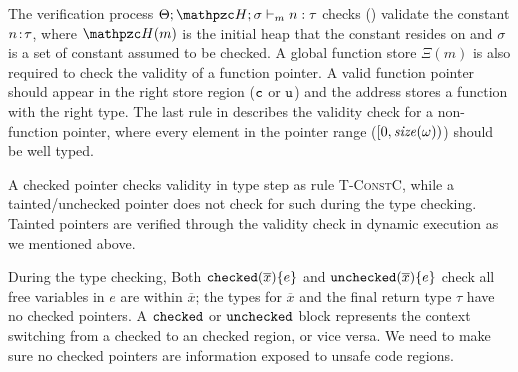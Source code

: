 The verification process $\Theta;\heap;\sigma \vdash_m n : \tau$ checks ()
validate the constant ${n}\!:\!{\tau}$, 
where $\heap(m)$ is the initial heap that the constant resides on and
$\sigma$ is a set of constant assumed to be checked.
A global function store $\Xi(m)$ is also required to check the validity of a function pointer.
A valid function pointer should appear in the right store region ($\texttt{c}$ or $\texttt{u}$)
and the address stores a function with the right type.
The last rule in  describes the validity check for a non-function pointer, 
where every element in the pointer range ($[0,\mathit{size}(\omega))$) should be well
typed.


A checked pointer checks validity in type step as rule \textsc{T-ConstC},
while a tainted/unchecked pointer does not check for such during the type checking.
Tainted pointers are verified through the validity check in dynamic execution as we mentioned above.


%
During the type checking,
Both $\mathtt{checked}({\overline{x}}){\{e\}}$ and $\mathtt{unchecked}({\overline{x}})\{e\}$
check all free variables in $e$ are within $\overline{x}$;
the types for $\overline{x}$ and the final return type $\tau$ have no checked pointers.
A $\mathtt{checked}$ or $\mathtt{unchecked}$ block represents 
the context switching from a checked to an checked region, or vice versa.
We need to make sure no checked pointers are information exposed to unsafe code regions.


